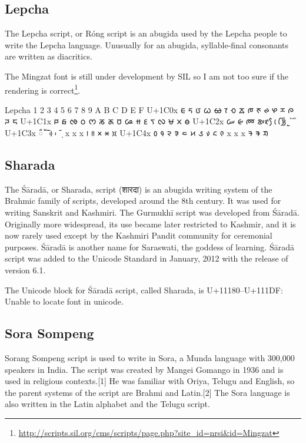 \subsection{Lepcha}
\newfontfamily{}

The Lepcha script, or Róng script is an abugida used by the Lepcha people to write the Lepcha language. Unusually for an abugida, syllable-final consonants are written as diacritics.

The Mingzat font is still under development by SIL so I am not too sure if the rendering is correct\footnote{\url{http://scripts.sil.org/cms/scripts/page.php?site_id=nrsi&id=Mingzat}}.

\begin{scriptexample}[]{Lepcha}
\bgroup
\lepcha
{}	1	2	3	4	5	6	7	8	9	A	B	C	D	E	F
U+1C0x	 ᰀ	ᰁ	ᰂ	ᰃ	ᰄ	ᰅ	ᰆ	ᰇ	ᰈ	ᰉ	ᰊ	ᰋ	ᰌ	ᰍ	ᰎ	ᰏ
U+1C1x	 ᰐ	ᰑ	ᰒ	ᰓ	ᰔ	ᰕ	ᰖ	ᰗ	ᰘ	ᰙ	ᰚ	ᰛ	ᰜ	ᰝ	ᰞ	ᰟ
U+1C2x	 ᰠ	ᰡ	ᰢ	ᰣ	ᰤ	ᰥ	ᰦ	ᰧ	ᰨ	ᰩ	ᰪ	ᰫ	ᰬ	ᰭ	ᰮ	ᰯ
U+1C3x	 ᰰ	ᰱ	ᰲ	ᰳ	ᰴ	ᰵ	ᰶ	᰷	x	x	x	᰻	᰼	᰽	᰾	᰿
U+1C4x	 ᱀	᱁	᱂	᱃	᱄	᱅	᱆	᱇	᱈	᱉	x	x	x	ᱍ	ᱎ	ᱏ

\egroup
\end{scriptexample}

\subsection{Sharada}

The Śāradā, or Sharada, script (शारदा) is an abugida writing system of the Brahmic family of scripts, developed around the 8th century. It was used for writing Sanskrit and Kashmiri. The Gurmukhī script was developed from Śāradā. Originally more widespread, its use became later restricted to Kashmir, and it is now rarely used except by the Kashmiri Pandit community for ceremonial purposes. Śāradā is another name for Saraswati, the goddess of learning.
Śāradā script was added to the Unicode Standard in January, 2012 with the release of version 6.1.

The Unicode block for Śāradā script, called Sharada, is U+11180–U+111DF:
Unable to locate font in unicode.


\subsection{Sora Sompeng}

Sorang Sompeng script is used to write in Sora, a Munda language with 300,000 speakers in India. The script was created by Mangei Gomango in 1936 and is used in religious contexts.[1] He was familiar with Oriya, Telugu and English, so the parent systems of the script are Brahmi and Latin.[2]
The Sora language is also written in the Latin alphabet and the Telugu script.

